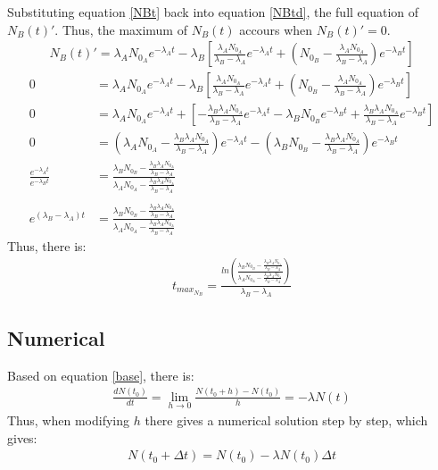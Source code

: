 \documentclass{article}
\begin{document}
Substituting equation \ref{NBt} back into equation \ref{NBtd}, the full equation of \(N_B(t)'\). Thus, the maximum of \(N_B(t)\) accours when \(N_B(t)'=0\).
\begin{align}
    N_B(t)'= \lambda_AN_{0_A}e^{-\lambda_At}-\lambda_B\left[\frac{\lambda_A N_{0_A}}{\lambda_B-\lambda_A}e^{-\lambda_At}+\left(N_{0_B}-\frac{\lambda_A N_{0_A}}{\lambda_B-\lambda_A}\right)e^{-\lambda_Bt}\right] \label{Nb'}
\end{align}
\begin{align*}
    0&= \lambda_AN_{0_A}e^{-\lambda_At}-\lambda_B\left[\frac{\lambda_A N_{0_A}}{\lambda_B-\lambda_A}e^{-\lambda_At}+\left(N_{0_B}-\frac{\lambda_A N_{0_A}}{\lambda_B-\lambda_A}\right)e^{-\lambda_Bt}\right]
    \\0&=\lambda_AN_{0_A}e^{-\lambda_At} +\left[-\frac{\lambda_B\lambda_A N_{0_A}}{\lambda_B-\lambda_A}e^{-\lambda_At}-\lambda_BN_{0_B}e^{-\lambda_Bt}+\frac{\lambda_B\lambda_A N_{0_A}}{\lambda_B-\lambda_A}e^{-\lambda_Bt}\right]\\
    0&=\left(\lambda_AN_{0_A}-\frac{\lambda_B\lambda_A N_{0_A}}{\lambda_B-\lambda_A}\right)e^{-\lambda_At}-\left(\lambda_BN_{0_B}-\frac{\lambda_B\lambda_A N_{0_A}}{\lambda_B-\lambda_A}\right)e^{-\lambda_Bt}
    \\ \frac{e^{-\lambda_At}}{e^{-\lambda_Bt}}&=\frac{\lambda_BN_{0_B}-\displaystyle \frac{\lambda_B\lambda_AN_{0_A}}{\lambda_B-\lambda_A}}{\lambda_AN_{0_A}-\displaystyle \frac{\lambda_B\lambda_AN_{0_A}}{\lambda_B-\lambda_A}}\\
    \\ e^{(\lambda_B-\lambda_A)t}&=\frac{\lambda_BN_{0_B}-\displaystyle \frac{\lambda_B\lambda_AN_{0_A}}{\lambda_B-\lambda_A}}{\lambda_AN_{0_A}-\displaystyle \frac{\lambda_B\lambda_AN_{0_A}}{\lambda_B-\lambda_A}}
\end{align*}
Thus, there is:
\begin{align}
    t_{max_{N_B}}=\frac{ln\left(\displaystyle \frac{\lambda_BN_{0_B}-\displaystyle \frac{\lambda_B\lambda_AN_{0_A}}{\lambda_B-\lambda_A}}{\lambda_AN_{0_A}-\displaystyle \frac{\lambda_B\lambda_AN_{0_A}}{\lambda_B-\lambda_A}}\right)}{\lambda_B-\lambda_A}
\end{align}
\subsection{Numerical}
Based on equation \ref{base}, there is:
\begin{align}
    \frac{dN(t_0)}{dt}= \lim_{h\to  0} \frac{N(t_0+h)-N(t_0)}{h} = -\lambda N (t)
\end{align}
Thus, when modifying \(h\) there gives a numerical solution step by step, which gives:
\begin{align}
    N(t_0+\Delta t)=N(t_0)-\lambda N(t_0)\Delta t
\end{align}
\newpage
\end{document}
